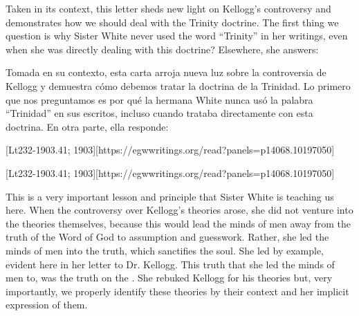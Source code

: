 Taken in its context, this letter sheds new light on Kellogg’s controversy and demonstrates how we should deal with the Trinity doctrine. The first thing we question is why Sister White never used the word “Trinity” in her writings, even when she was directly dealing with this doctrine? Elsewhere, she answers:


Tomada en su contexto, esta carta arroja nueva luz sobre la controversia de Kellogg y demuestra cómo debemos tratar la doctrina de la Trinidad. Lo primero que nos preguntamos es por qué la hermana White nunca usó la palabra “Trinidad” en sus escritos, incluso cuando trataba directamente con esta doctrina. En otra parte, ella responde:


[Lt232-1903.41; 1903][https://egwwritings.org/read?panels=p14068.10197050]


[Lt232-1903.41; 1903][https://egwwritings.org/read?panels=p14068.10197050]


This is a very important lesson and principle that Sister White is teaching us here. When the controversy over Kellogg’s theories arose, she did not venture into the theories themselves, because this would lead the minds of men away from the truth of the Word of God to assumption and guesswork. Rather, she led the minds of men into the truth, which sanctifies the soul. She led by example, evident here in her letter to Dr. Kellogg. This truth that she led the minds of men to, was the truth on the . She rebuked Kellogg for his theories but, very importantly, we properly identify these theories by their context and her implicit expression of them.


